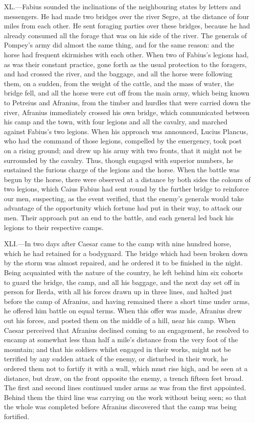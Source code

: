 XL.—Fabius sounded the inclinations of the neighbouring states by
letters and messengers. He had made two bridges over the river Segre, at
the distance of four miles from each other. He sent foraging parties
over these bridges, because he had already consumed all the forage that
was on his side of the river. The generals of Pompey's army did almost
the same thing, and for the same reason: and the horse had frequent
skirmishes with each other. When two of Fabius's legions had, as was
their constant practice, gone forth as the usual protection to the
foragers, and had crossed the river, and the baggage, and all the horse
were following them, on a sudden, from the weight of the cattle, and the
mass of water, the bridge fell, and all the horse were cut off from the
main army, which being known to Petreius and Afranius, from the timber
and hurdles that were carried down the river, Afranius immediately
crossed his own bridge, which communicated between his camp and the
town, with four legions and all the cavalry, and marched against
Fabius's two legions. When his approach was announced, Lucius Plancus,
who had the command of those legions, compelled by the emergency, took
post on a rising ground; and drew up his army with two fronts, that it
might not be surrounded by the cavalry. Thus, though engaged with
superior numbers, he sustained the furious charge of the legions and the
horse. When the battle was begun by the horse, there were observed at a
distance by both sides the colours of two legions, which Caius Fabius
had sent round by the further bridge to reinforce our men, suspecting,
as the event verified, that the enemy's generals would take advantage of
the opportunity which fortune had put in their way, to attack our men.
Their approach put an end to the battle, and each general led back his
legions to their respective camps.

XLI.—In two days after Caesar came to the camp with nine hundred horse,
which he had retained for a bodyguard. The bridge which had been broken
down by the storm was almost repaired, and he ordered it to be finished
in the night. Being acquainted with the nature of the country, he left
behind him six cohorts to guard the bridge, the camp, and all his
baggage, and the next day set off in person for Ilerda, with all his
forces drawn up in three lines, and halted just before the camp of
Afranius, and having remained there a short time under arms, he offered
him battle on equal terms. When this offer was made, Afranius drew out
his forces, and posted them on the middle of a hill, near his camp. When
Caesar perceived that Afranius declined coming to an engagement, he
resolved to encamp at somewhat less than half a mile's distance from the
very foot of the mountain; and that his soldiers whilst engaged in their
works, might not be terrified by any sudden attack of the enemy, or
disturbed in their work, he ordered them not to fortify it with a wall,
which must rise high, and be seen at a distance, but draw, on the front
opposite the enemy, a trench fifteen feet broad. The first and second
lines continued under arms as was from the first appointed. Behind them
the third line was carrying on the work without being seen; so that the
whole was completed before Afranius discovered that the camp was being
fortified.

